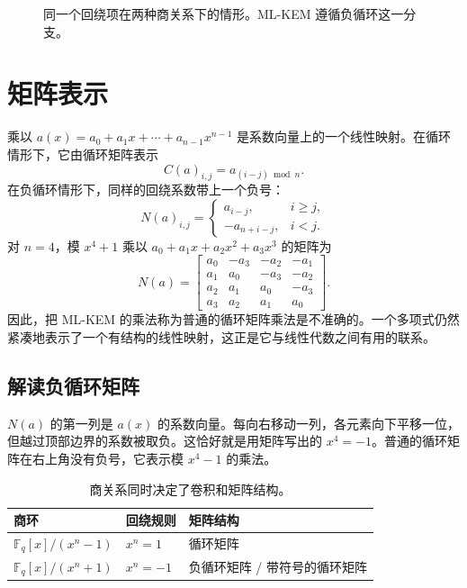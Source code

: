 \begin{figure}[H]
\centering
{}
\caption{同一个回绕项在两种商关系下的情形。ML-KEM 遵循负循环这一分支。}
\label{fig:cyclic-vs-negacyclic}
\end{figure}

\section{矩阵表示}

乘以 $a(x)=a_0+a_1x+\cdots+a_{n-1}x^{n-1}$ 是系数向量上的一个线性映射。在循环情形下，它由循环矩阵表示
\[
C(a)_{i,j}=a_{(i-j)\bmod n}.
\]
在负循环情形下，同样的回绕系数带上一个负号：
\[
N(a)_{i,j}=\begin{cases}
 a_{i-j},&i\ge j,\\
 -a_{n+i-j},&i<j.
\end{cases}
\]
对 $n=4$，模 $x^4+1$ 乘以 $a_0+a_1x+a_2x^2+a_3x^3$ 的矩阵为
\[
N(a)=
\begin{bmatrix}
a_0&-a_3&-a_2&-a_1\\
a_1&a_0&-a_3&-a_2\\
a_2&a_1&a_0&-a_3\\
a_3&a_2&a_1&a_0
\end{bmatrix}.
\]
因此，把 ML-KEM 的乘法称为普通的循环矩阵乘法是不准确的。一个多项式仍然紧凑地表示了一个有结构的线性映射，这正是它与线性代数之间有用的联系。

\subsection{解读负循环矩阵}

$N(a)$ 的第一列是 $a(x)$ 的系数向量。每向右移动一列，各元素向下平移一位，但越过顶部边界的系数被取负。这恰好就是用矩阵写出的 $x^4=-1$。普通的循环矩阵在右上角没有负号，它表示模 $x^4-1$ 的乘法。

\begin{table}[H]
\centering
\begin{tabular}{lll}
\toprule
商环 & 回绕规则 & 矩阵结构 \\
\midrule
$\mathbb{F}_q[x]/(x^n-1)$ & $x^n=1$ & 循环矩阵 \\
$\mathbb{F}_q[x]/(x^n+1)$ & $x^n=-1$ & 负循环矩阵 / 带符号的循环矩阵 \\
\bottomrule
\end{tabular}
\caption{商关系同时决定了卷积和矩阵结构。}
\end{table}

